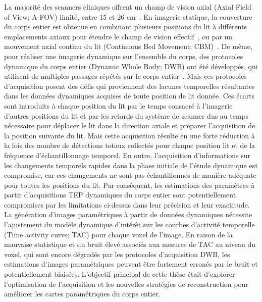 La majorité des scanners cliniques offrent un champ de vision axial (Axial Field of View; A-FOV) limité, entre 15 et 26 cm~\cite{Vandenberghe2020}. En imagerie statique, la couverture du corps entier est obtenue en combinant plusieurs positions du lit à différents emplacements axiaux pour étendre le champ de vision effectif~\cite{Schubert1996}, ou par un mouvement axial continu du lit (Continuous Bed Movement; CBM)~\cite{Panin2014}.
De même, pour réaliser une imagerie dynamique sur l'ensemble du corps, des protocoles dynamique du corps entier (Dynamic Whole Body; DWB) ont été développés, qui utilisent de multiples passages répétés sur le corps entier~\cite{Karakatsanis2011,Karakatsanis2013,Rahmim2019}. 
Mais ces protocoles d'acquisition posent des défis qui proviennent des lacunes temporelles résultantes dans les données dynamiques acquises de toute position de lit donnée. Ces écarts sont introduits à chaque position du lit par le temps consacré à l'imagerie d'autres positions du lit et par les retards du système de scanner dus au temps nécessaire pour déplacer le lit dans la direction axiale et préparer l'acquisition de la position suivante du lit. Mais cette acquisition résulte en une forte réduction à la fois des nombre de détections totaux collectés pour chaque position lit et de la fréquence d'échantillonnage temporel. En outre, l'acquisition d'informations sur les changements temporels rapides dans la phase initiale de l'étude dynamique est compromise, car ces changements ne sont pas échantillonnés de manière adéquate pour toutes les positions du lit. Par conséquent, les estimations des paramètres à partir d'acquisitions TEP dynamiques du corps entier sont potentiellement compromises par les limitations ci-dessus dans leur précision et leur exactitude.
La génération d'images paramétriques à partir de données dynamiques nécessite l'ajustement du modèle dynamique d'intérêt sur les courbes d'activité temporelle (Time activity curve; TAC) pour chaque voxel de l'image. En raison de la mauvaise statistique et du bruit élevé associés aux mesures de TAC au niveau du voxel, qui sont encore dégradés par les protocoles d'acquisition DWB, les estimations d'images paramétriques peuvent être fortement erronés par le bruit et potentiellement biaisées.
L'objectif principal de cette thèse était d'explorer l'optimisation de l'acquisition et les nouvelles stratégies de reconstruction pour améliorer les cartes paramétriques du corps entier. 

